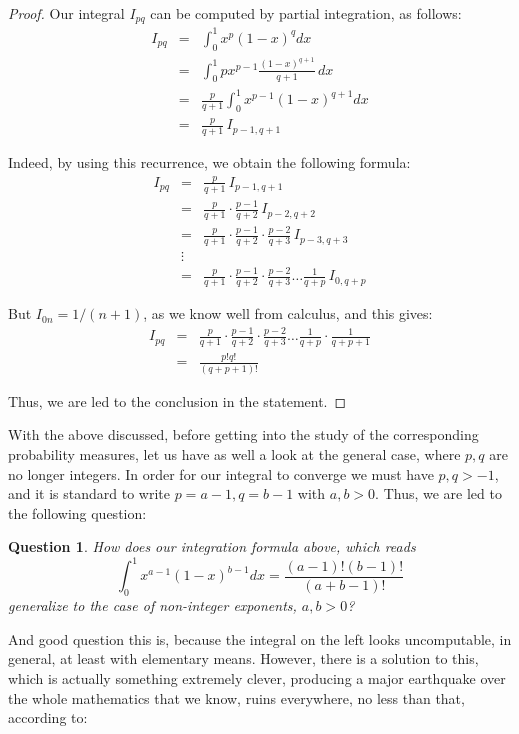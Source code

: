 \documentclass[12pt]{amsbook}
\newtheorem{question}[theorem]{Question}
\begin{document}
\begin{proof}
Our integral $I_{pq}$ can be computed by partial integration, as follows:
\begin{eqnarray*}
I_{pq}
&=&\int_0^1x^p(1-x)^qdx\\
&=&\int_0^1px^{p-1}\frac{(1-x)^{q+1}}{q+1}\,dx\\
&=&\frac{p}{q+1}\int_0^1x^{p-1}(1-x)^{q+1}dx\\
&=&\frac{p}{q+1}\,I_{p-1,q+1}
\end{eqnarray*}

Indeed, by using this recurrence, we obtain the following formula:
\begin{eqnarray*}
I_{pq}
&=&\frac{p}{q+1}\,I_{p-1,q+1}\\
&=&\frac{p}{q+1}\cdot\frac{p-1}{q+2}\,I_{p-2,q+2}\\
&=&\frac{p}{q+1}\cdot\frac{p-1}{q+2}\cdot\frac{p-2}{q+3}\,I_{p-3,q+3}\\
&\vdots&\\
&=&\frac{p}{q+1}\cdot\frac{p-1}{q+2}\cdot\frac{p-2}{q+3}\ldots\frac{1}{q+p}\,I_{0,q+p}
\end{eqnarray*}

But $I_{0n}=1/(n+1)$, as we know well from calculus, and this gives:
\begin{eqnarray*}
I_{pq}
&=&\frac{p}{q+1}\cdot\frac{p-1}{q+2}\cdot\frac{p-2}{q+3}\ldots\frac{1}{q+p}\cdot\frac{1}{q+p+1}\\
&=&\frac{p!q!}{(q+p+1)!}
\end{eqnarray*}

Thus, we are led to the conclusion in the statement.
\end{proof}

With the above discussed, before getting into the study of the corresponding probability measures, let us have as well a look at the general case, where $p,q$ are no longer integers. In order for our integral to converge we must have $p,q>-1$, and it is standard to write $p=a-1,q=b-1$ with $a,b>0$. Thus, we are led to the following question:

\begin{question}
How does our integration formula above, which reads
$$\int_0^1x^{a-1}(1-x)^{b-1}dx=\frac{(a-1)!(b-1)!}{(a+b-1)!}$$
generalize to the case of non-integer exponents, $a,b>0$?
\end{question}

And good question this is, because the integral on the left looks uncomputable, in general, at least with elementary means. However, there is a solution to this, which is actually something extremely clever, producing a major earthquake over the whole mathematics that we know, ruins everywhere, no less than that, according to:
\end{document}
